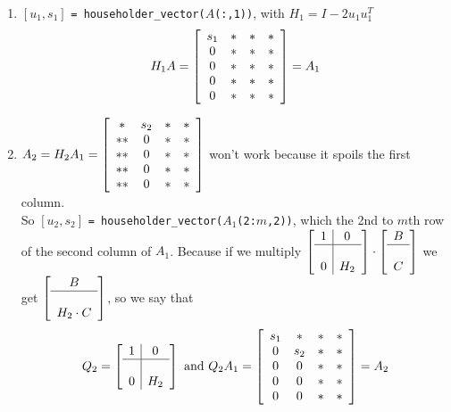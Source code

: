 \documentclass[10pt]{report}
\begin{document}
\begin{enumerate}
	\item $[u_1, s_1]$ \texttt{= householder\_vector($A$(:,1))}, with $H_1 = I-2u_1u_1^T$
	$$H_1A = \left[\begin{array}{c c c c}
	s_1&*&*&*\\
	0&*&*&*\\
	0&*&*&*\\
	0&*&*&*\\
	0&*&*&*\\
	\end{array}\right] = A_1$$
	\item $A_2 = H_2A_1 = \left[\begin{array}{c c c c}
	*&s_2&*&*\\
	**&0&*&*\\
	**&0&*&*\\
	**&0&*&*\\
	**&0&*&*\\
	\end{array}\right]$ won't work because it spoils the first column.\\
	So $[u_2,s_2]$ \texttt{= householder\_vector($A_1$(2:$m$,2))}, which the 2nd to $m$th row of the second column of $A_1$. Because if we multiply $\left[\begin{array}{c | c}
	1 & 0\\
	\hline\\
	0 & H_2
	\end{array}\right]\cdot\left[\begin{array}{c}
	B\\\hline\\C
	\end{array}\right]$ we get $\left[\begin{array}{c}
	B\\\hline\\H_2\cdot C
	\end{array}\right]$, so we say that $$Q_2 = \left[\begin{array}{c | c}
	1 & 0\\
	\hline\\
	0 & H_2
	\end{array}\right]\text{ and }Q_2A_1 = \left[\begin{array}{c c c c}
	s_1&*&*&*\\
	0&s_2&*&*\\
	0&0&*&*\\
	0&0&*&*\\
	0&0&*&*\\
	\end{array}\right] = A_2$$

\end{enumerate}
\end{document}
